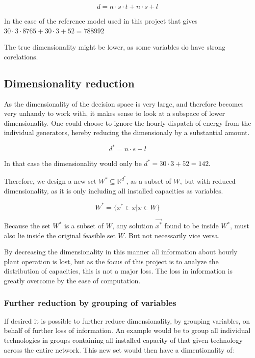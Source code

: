 \begin{equation}\label{eq:dimentionality}
d = n\cdot s \cdot t + n\cdot s + l
\end{equation}


In the case of the reference model used in this project that gives 
$ 30 \cdot 3 \cdot 8765 + 30 \cdot 3 + 52 = 788992 $ 


The true dimensionality might be lower, as some variables do have strong corelations. 


\subsection{Dimensionality reduction}

As the dimensionality of the decision space is very large, and therefore becomes very unhandy to work with, it makes sense to look at a subspace of lower dimensionality. One could choose to ignore the hourly dispatch of energy from the individual generators, hereby reducing the dimensionaly by a substantial amount. 

\begin{equation}
d^* = n\cdot s + l
\end{equation}

In that case the dimensionality would only be $d^* = 30\cdot 3 + 52 = 142$. 

Therefore, we design a new set $W^* \subseteq \mathbb{R}^{d^*}$, as a subset of $W$, but with reduced dimensionality, as it is only including all installed capacities as variables. 

\begin{equation}
	W^* = \{ x^* \in x | x \in W \}
\end{equation}

Because the set $W^*$ is a subset of $W$, any solution $\vec{x^*}$ found to be inside $W^*$, must also lie inside the original feasible set $W$. But not necessarily vice versa. 

By decreasing the dimensionality in this manner all information about hourly plant operation is lost, but as the focus of this project is to analyze the distribution of capacities, this is not a major loss. The loss in information is greatly overcome by the ease of computation. 

\subsubsection{Further reduction by grouping of variables}
If desired it is possible to further reduce dimensionality, by grouping variables, on behalf of further loss of information. An example would be to group all individual technologies in groups containing all installed capacity of that given technology across the entire network. This new set would then have a dimentionality of:

